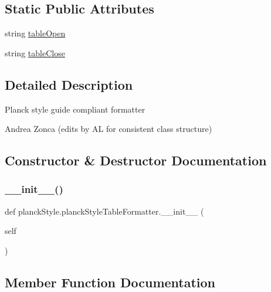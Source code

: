 \subsection*{Static Public Attributes}
\begin{DoxyCompactItemize}
\item 
string \mbox{\hyperlink{classplanckStyle_1_1planckStyleTableFormatter_aa90d51aa273522f912f9fc740e7c4d6d}{table\+Open}}
\item 
string \mbox{\hyperlink{classplanckStyle_1_1planckStyleTableFormatter_a26ae8ecfa11c3cf77db543e1df211bda}{table\+Close}}
\end{DoxyCompactItemize}


\subsection{Detailed Description}
\begin{DoxyVerb}Planck style guide compliant formatter

Andrea Zonca (edits by AL for consistent class structure)\end{DoxyVerb}
 

\subsection{Constructor \& Destructor Documentation}
\mbox{\label{classplanckStyle_1_1planckStyleTableFormatter_aad10adb753214b4a998d6744e557c746}} 
\subsubsection{\texorpdfstring{\+\_\+\+\_\+init\+\_\+\+\_\+()}{\_\_init\_\_()}}
{\footnotesize\ttfamily def planck\+Style.\+planck\+Style\+Table\+Formatter.\+\_\+\+\_\+init\+\_\+\+\_\+ (\begin{DoxyParamCaption}\item[{}]{self }\end{DoxyParamCaption})}



\subsection{Member Function Documentation}
\mbox{\label{classplanckStyle_1_1planckStyleTableFormatter_aac368526501b5610660e0af83efc4b9d}} 
